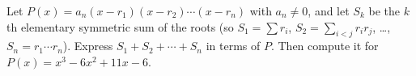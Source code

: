Let $P(x)=a_n(x-r_1)(x-r_2)\cdots(x-r_n)$ with $a_n\ne0$, and let $S_k$ be the $k$th elementary symmetric sum of the roots (so $S_1=\sum r_i$, $S_2=\sum_{i<j}r_ir_j$, \dots, $S_n=r_1\cdots r_n$). Express $S_1+S_2+\cdots+S_n$ in terms of $P$. Then compute it for $P(x)=x^3-6x^2+11x-6$.
